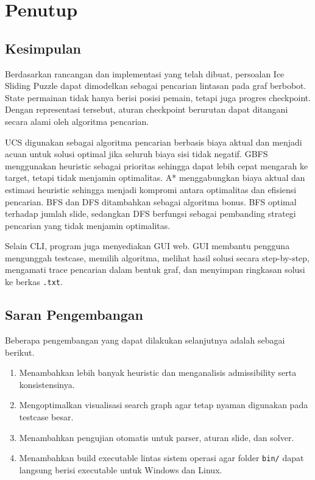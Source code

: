 \section{Penutup}

\subsection{Kesimpulan}\label{sub:Kesimpulan}

Berdasarkan rancangan dan implementasi yang telah dibuat, persoalan
Ice Sliding Puzzle dapat dimodelkan sebagai pencarian lintasan pada
graf berbobot. State permainan tidak hanya berisi posisi pemain,
tetapi juga progres checkpoint. Dengan representasi tersebut, aturan
checkpoint berurutan dapat ditangani secara alami oleh algoritma
pencarian.

UCS digunakan sebagai algoritma pencarian berbasis biaya aktual dan
menjadi acuan untuk solusi optimal jika seluruh biaya sisi tidak
negatif. GBFS menggunakan heuristic sebagai prioritas sehingga dapat
lebih cepat mengarah ke target, tetapi tidak menjamin optimalitas.
A* menggabungkan biaya aktual dan estimasi heuristic sehingga menjadi
kompromi antara optimalitas dan efisiensi pencarian. BFS dan DFS
ditambahkan sebagai algoritma bonus. BFS optimal terhadap jumlah slide,
sedangkan DFS berfungsi sebagai pembanding strategi pencarian yang
tidak menjamin optimalitas.

Selain CLI, program juga menyediakan GUI web. GUI membantu pengguna
mengunggah testcase, memilih algoritma, melihat hasil solusi secara
step-by-step, mengamati trace pencarian dalam bentuk graf, dan
menyimpan ringkasan solusi ke berkas \texttt{.txt}.

\subsection{Saran Pengembangan}\label{sub:Saran Pengembangan}

Beberapa pengembangan yang dapat dilakukan selanjutnya adalah sebagai
berikut.
\begin{enumerate}
    \item Menambahkan lebih banyak heuristic dan menganalisis
        admissibility serta konsistensinya.
    \item Mengoptimalkan visualisasi search graph agar tetap nyaman
        digunakan pada testcase besar.
    \item Menambahkan pengujian otomatis untuk parser, aturan slide,
        dan solver.
    \item Menambahkan build executable lintas sistem operasi agar
        folder \texttt{bin/} dapat langsung berisi executable untuk
        Windows dan Linux.
\end{enumerate}

